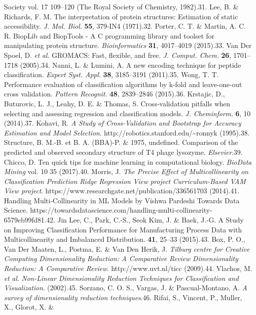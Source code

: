 \documentclass[
]{article}
\begin{document}
{{{{Society} vol. 17 109--120 (The Royal Society of Chemistry, 1982).31.
Lee, B. \& Richards, F. M. The interpretation of protein structures:
Estimation of static accessibility. \emph{J. Mol. Biol.} \textbf{55},
379-IN4 (1971).32. Porter, C. T. \& Martin, A. C. R. BiopLib and
BiopTools - A C programming library and toolset for manipulating protein
structure. \emph{Bioinformatics} \textbf{31}, 4017--4019 (2015).33. Van
Der Spoel, D. \emph{et al.} GROMACS: Fast, flexible, and free. \emph{J.
Comput. Chem.} \textbf{26}, 1701--1718 (2005).34. Nanni, L. \& Lumini,
A. A new encoding technique for peptide classification. \emph{Expert
Syst. Appl.} \textbf{38}, 3185--3191 (2011).35. Wong, T. T. Performance
evaluation of classification algorithms by k-fold and leave-one-out
cross validation. \emph{Pattern Recognit.} \textbf{48}, 2839--2846
(2015).36. Krstajic, D., Buturovic, L. J., Leahy, D. E. \& Thomas, S.
Cross-validation pitfalls when selecting and assessing regression and
classification models. \emph{J. Cheminform.} \textbf{6}, 10 (2014).37.
Kohavi, R. \emph{A Study of Cross-Validation and Bootstrap for Accuracy
Estimation and Model Selection}.
http://robotics.stanford.edu/\textasciitilde ronnyk (1995).38.
Structure, B. M.-B. et B. A. (BBA)-P. \& 1975, undefined. Comparison of
the predicted and observed secondary structure of T4 phage lysozyme.
\emph{Elsevier}.39. Chicco, D. Ten quick tips for machine learning in
computational biology. \emph{BioData Mining} vol. 10 35 (2017).40.
Morris, J. \emph{The Precise Effect of Multicollinearity on
Classification Prediction Ridge Regression View project Curriculum-Based
VAM View project}. https://www.researchgate.net/publication/336561703
(2014).41. Handling Multi-Collinearity in ML Models \textbar{} by Vishwa
Pardeshi \textbar{} Towards Data Science.
https://towardsdatascience.com/handling-multi-collinearity-6579eb99fd81.42.
Jin Lee, C., Park, C.-S., Seok Kim, J. \& Baek, J.-G. A Study on
Improving Classification Performance for Manufacturing Process Data with
Multicollinearity and Imbalanced Distribution. \textbf{41}, 25--33
(2015).43. Box, P. O., Van Der Maaten, L., Postma, E. \& Van Den Herik,
J. \emph{Tilburg centre for Creative Computing Dimensionality Reduction:
A Comparative Review Dimensionality Reduction: A Comparative Review}.
http://www.uvt.nl/ticc (2009).44. Vlachos, M. \emph{et al.}
\emph{Non-Linear Dimensionality Reduction Techniques for Classification
and Visualization}. (2002).45. Sorzano, C. O. S., Vargas, J. \&
Pascual-Montano, A. \emph{A survey of dimensionality reduction
techniques}.46. Rifai, S., Vincent, P., Muller, X., Glorot, X. \&
}}}
\end{document}
